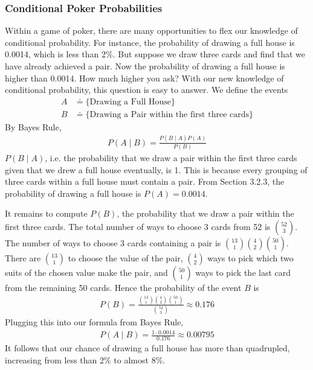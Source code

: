 \documentclass[11pt,letterpaper]{article}
\numberwithin{theorem}{section}
\numberwithin{definition}{section}
\numberwithin{lemma}{section}
\numberwithin{corollary}{section}
\numberwithin{proposition}{section}
\theoremstyle{definition}
\numberwithin{remark}{section}
\numberwithin{claim}{section}
\numberwithin{observation}{section}
\numberwithin{fact}{section}
\numberwithin{assumption}{section}
\numberwithin{example}{section}
\numberwithin{exercise}{section}
\begin{document}
\subsubsection{Conditional Poker Probabilities}
Within a game of poker, there are many opportunities to flex our knowledge of conditional probability. For instance, the probability of drawing a full house is 0.0014, which is less than 2\%. But suppose we draw three cards and find that we have already achieved a pair. Now the probability of drawing a full house is higher than 0.0014. How much higher you ask? With our new knowledge of conditional probability, this question is easy to answer. We define the events
\begin{align*}
A &\doteq \{\text{Drawing a Full House}\} \\
B &\doteq \{\text{Drawing a Pair within the first three cards}\}
\end{align*}
By Bayes Rule,
\begin{align*}
P(A \mid B) = \frac{P(B \mid A) P(A)}{P(B)}
\end{align*}
$P(B \mid A)$, i.e. the probability that we draw a pair within the first three cards given that we drew a full house eventually, is 1. This is because every grouping of three cards within a full house must contain a pair. From Section 3.2.3, the probability of drawing a full house is $P(A) = 0.0014$. 

It remains to compute $P(B)$, the probability that we draw a pair within the first three cards. The total number of ways to choose 3 cards from 52 is $\binom{52}{3}$. The number of ways to choose 3 cards containing a pair is $\binom{13}{1} \binom{4}{2} \binom{50}{1}$. There are $\binom{13}{1}$ to choose the value of the pair, $\binom{4}{2}$ ways to pick which two suits of the chosen value make the pair, and $\binom{50}{1}$ ways to pick the last card from the remaining 50 cards. Hence the probability of the event $B$ is
\begin{align*}
P(B) = \frac{\binom{13}{1} \binom{4}{2} \binom{50}{1}}{\binom{52}{3}} \approx 0.176
\end{align*}
Plugging this into our formula from Bayes Rule,
\begin{align*}
P(A \mid B) = \frac{1 \cdot 0.0014}{0.176} \approx 0.00795
\end{align*}
It follows that our chance of drawing a full house has more than quadrupled, increasing from less than 2\% to almost 8\%. 

\newpage
\end{document}
